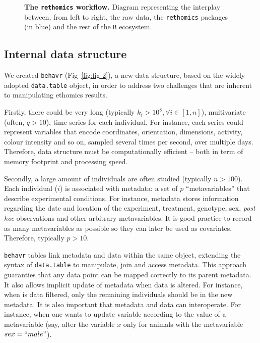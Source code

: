 \documentclass[10pt,letterpaper]{article}\usepackage[]{graphicx}\usepackage[]{color}
\begin{document}
\begin{figure}[!h]
	\caption{{\bf The \texttt{rethomics} workflow.}
		Diagram representing the interplay between, from left to right, the raw data, the \texttt{rethomics} packages (in blue) and the rest of the \texttt{R} ecosystem.}
	\label{fig:fig-1}
\end{figure}


\subsection*{Internal data structure}
We created \texttt{behavr} (Fig~\ref{fig:fig-2}), a new data structure, based on the widely adopted \texttt{data.table} object, in order to address 
two challenges that are inherent to manipulating ethomics results.

Firstly, there could be very long (typically $k_i > 10^8, \forall i \in [1,n]$), multivariate (often, $q > 10$), time series for each individual.
For instance, each series could represent variables that encode coordinates, orientation, dimensions, activity, colour intensity and so on, sampled several times per second, over multiple days.
Therefore, data structure must be computationally efficient -- both in term of memory footprint and processing speed. 

Secondly, a large amount of individuals are often studied (typically $n > 100$).
Each individual ($i$) is associated with metadata: a set of $p$ ``metavariables'' that describe experimental conditions.
For instance, metadata stores information regarding the date and location of the experiment, treatment, genotype, sex, \emph{post hoc} observations and other arbitrary metavariables.
It is good practice to record as many metavariables as possible so they can later be used as covariates. 
Therefore, typically $p > 10$.

\texttt{behavr} tables link metadata and data within the same object, extending the syntax of \texttt{data.table} to manipulate, join and access metadata.
This approach guaranties that any data point can be mapped correctly to its parent metadata.
It also allows implicit update of metadata when data is altered.
For instance, when is data filtered, only the remaining individuals should be in the new metadata. 
It is also important that metadata and data can interoperate.
For instance, when one wants to update variable according to the value of a metavariable (say, alter the variable $x$ only for animals with the metavariable $sex=``male"$).
\end{document}
